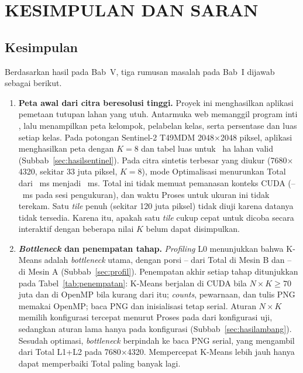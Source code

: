 \chapter{KESIMPULAN DAN SARAN}

\section{Kesimpulan}
Berdasarkan hasil pada Bab~V, tiga rumusan masalah pada Bab~I dijawab sebagai berikut.
\begin{enumerate}
    \item \textbf{Peta awal dari citra beresolusi tinggi.} Proyek ini menghasilkan aplikasi pemetaan tutupan lahan yang utuh. Antarmuka web memanggil program inti , lalu menampilkan peta kelompok, pelabelan kelas, serta persentase dan luas setiap kelas. Pada potongan Sentinel-2 T49MDM 2048$\times$2048 piksel, aplikasi menghasilkan peta dengan $K=8$ dan tabel luas untuk \SValidHa~ha lahan valid (Subbab~\ref{sec:hasilsentinel}). Pada citra sintetis terbesar yang diukur (7680$\times$4320, sekitar 33 juta piksel, $K=8$), mode Optimalisasi menurunkan Total dari \LoTotalDelapan~ms menjadi \LdLdTotalDelapan~ms. Total ini tidak memuat pemanasan konteks CUDA (\WarmMin--\WarmMax~ms pada sesi pengukuran), dan waktu Proses untuk ukuran ini tidak terekam. Satu \emph{tile} penuh (sekitar 120 juta piksel) tidak diuji karena datanya tidak tersedia. Karena itu, apakah satu \emph{tile} cukup cepat untuk dicoba secara interaktif dengan beberapa nilai $K$ belum dapat disimpulkan.
    \item \textbf{\emph{Bottleneck} dan penempatan tahap.} \emph{Profiling} L0 menunjukkan bahwa K-Means adalah \emph{bottleneck} utama, dengan porsi \PorsiKMLoMin--\PorsiKMLoMax{} dari Total di Mesin B dan \PorsiKMAMin--\PorsiKMAMax{} di Mesin A (Subbab~\ref{sec:profil}). Penempatan akhir setiap tahap ditunjukkan pada Tabel~\ref{tab:penempatan}: K-Means berjalan di CUDA bila $N\times K\geq70$ juta dan di OpenMP bila kurang dari itu; \emph{counts}, pewarnaan, dan tulis PNG memakai OpenMP; baca PNG dan inisialisasi tetap serial. Aturan $N\times K$ memilih konfigurasi tercepat menurut Proses pada \AmbBaruBenarProses{} dari \AmbJumlah{} konfigurasi uji, sedangkan aturan lama hanya pada \AmbLamaBenarProses{} konfigurasi (Subbab~\ref{sec:hasilambang}). Sesudah optimasi, \emph{bottleneck} berpindah ke baca PNG serial, yang mengambil \PorsiBacaLdLdDelapan{} dari Total L1+L2 pada 7680$\times$4320. Mempercepat K-Means lebih jauh hanya dapat memperbaiki Total paling banyak \AmdBatasLdLd{} lagi.

\end{enumerate}
